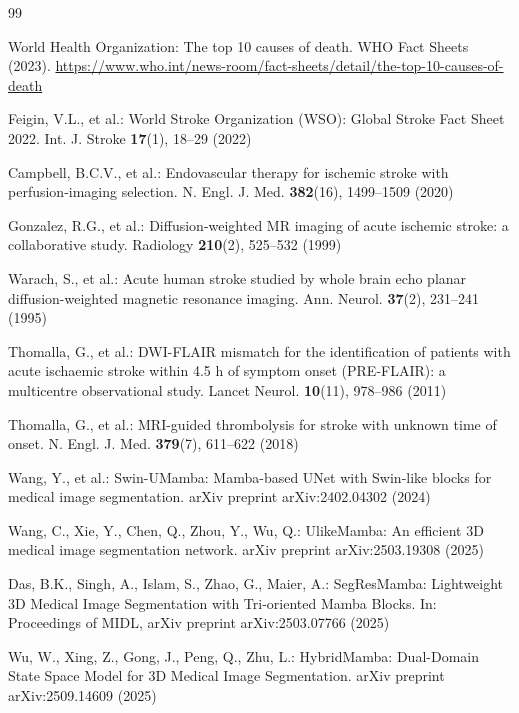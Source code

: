 \documentclass[pdflatex,sn-mathphys-num]{sn-jnl}
\begin{document}
\begin{thebibliography}{99}

World Health Organization: The top 10 causes of death. WHO Fact Sheets (2023). \url{https://www.who.int/news-room/fact-sheets/detail/the-top-10-causes-of-death}

Feigin, V.L., et al.: World Stroke Organization (WSO): Global Stroke Fact Sheet 2022. Int. J. Stroke \textbf{17}(1), 18--29 (2022)

Campbell, B.C.V., et al.: Endovascular therapy for ischemic stroke with perfusion-imaging selection. N. Engl. J. Med. \textbf{382}(16), 1499--1509 (2020)

Gonzalez, R.G., et al.: Diffusion-weighted MR imaging of acute ischemic stroke: a collaborative study. Radiology \textbf{210}(2), 525--532 (1999)

Warach, S., et al.: Acute human stroke studied by whole brain echo planar diffusion-weighted magnetic resonance imaging. Ann. Neurol. \textbf{37}(2), 231--241 (1995)

Thomalla, G., et al.: DWI-FLAIR mismatch for the identification of patients with acute ischaemic stroke within 4.5 h of symptom onset (PRE-FLAIR): a multicentre observational study. Lancet Neurol. \textbf{10}(11), 978--986 (2011)

Thomalla, G., et al.: MRI-guided thrombolysis for stroke with unknown time of onset. N. Engl. J. Med. \textbf{379}(7), 611--622 (2018)

Wang, Y., et al.: Swin-UMamba: Mamba-based UNet with Swin-like blocks for medical image segmentation. arXiv preprint arXiv:2402.04302 (2024)

Wang, C., Xie, Y., Chen, Q., Zhou, Y., Wu, Q.: UlikeMamba: An efficient 3D medical image segmentation network. arXiv preprint arXiv:2503.19308 (2025)

Das, B.K., Singh, A., Islam, S., Zhao, G., Maier, A.: SegResMamba: Lightweight 3D Medical Image Segmentation with Tri-oriented Mamba Blocks. In: Proceedings of MIDL, arXiv preprint arXiv:2503.07766 (2025)

Wu, W., Xing, Z., Gong, J., Peng, Q., Zhu, L.: HybridMamba: Dual-Domain State Space Model for 3D Medical Image Segmentation. arXiv preprint arXiv:2509.14609 (2025)


\end{thebibliography}
\end{document}
